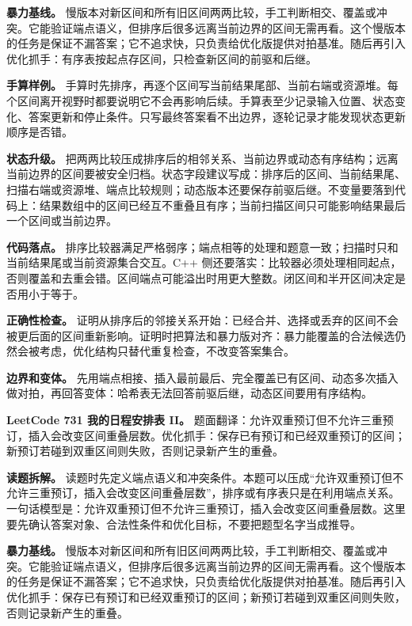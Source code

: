 \textbf{暴力基线。} 慢版本对新区间和所有旧区间两两比较，手工判断相交、覆盖或冲突。它能验证端点语义，但排序后很多远离当前边界的区间无需再看。这个慢版本的任务是保证不漏答案；它不追求快，只负责给优化版提供对拍基准。随后再引入优化抓手：有序表按起点存区间，只检查新区间的前驱和后继。

\textbf{手算样例。} 手算时先排序，再逐个区间写当前结果尾部、当前右端或资源堆。每个区间离开视野时都要说明它不会再影响后续。手算表至少记录输入位置、状态变化、答案更新和停止条件。只写最终答案看不出边界，逐轮记录才能发现状态更新顺序是否错。

\textbf{状态升级。} 把两两比较压成排序后的相邻关系、当前边界或动态有序结构；远离当前边界的区间要被安全归档。状态字段建议写成：排序后的区间、当前结果尾、扫描右端或资源堆、端点比较规则；动态版本还要保存前驱后继。不变量要落到代码上：结果数组中的区间已经互不重叠且有序；当前扫描区间只可能影响结果最后一个区间或当前边界。

\textbf{代码落点。} 排序比较器满足严格弱序；端点相等的处理和题意一致；扫描时只和当前结果尾或当前资源集合交互。C++ 侧还要落实：比较器必须处理相同起点，否则覆盖和去重会错。区间端点可能溢出时用更大整数。闭区间和半开区间决定是否用小于等于。

\textbf{正确性检查。} 证明从排序后的邻接关系开始：已经合并、选择或丢弃的区间不会被更后面的区间重新影响。证明时把算法和暴力版对齐：暴力能覆盖的合法候选仍然会被考虑，优化结构只替代重复检查，不改变答案集合。

\textbf{边界和变体。} 先用端点相接、插入最前最后、完全覆盖已有区间、动态多次插入做对拍，再回答变体：哈希表无法回答前驱后继，动态区间要用有序结构。

\noindent\textbf{LeetCode 731 我的日程安排表 II。} 题面翻译：允许双重预订但不允许三重预订，插入会改变区间重叠层数。优化抓手：保存已有预订和已经双重预订的区间；新预订若碰到双重区间则失败，否则记录新产生的重叠。

\textbf{读题拆解。} 读题时先定义端点语义和冲突条件。本题可以压成“允许双重预订但不允许三重预订，插入会改变区间重叠层数”，排序或有序表只是在利用端点关系。一句话模型是：允许双重预订但不允许三重预订，插入会改变区间重叠层数。这里要先确认答案对象、合法性条件和优化目标，不要把题型名字当成推导。

\textbf{暴力基线。} 慢版本对新区间和所有旧区间两两比较，手工判断相交、覆盖或冲突。它能验证端点语义，但排序后很多远离当前边界的区间无需再看。这个慢版本的任务是保证不漏答案；它不追求快，只负责给优化版提供对拍基准。随后再引入优化抓手：保存已有预订和已经双重预订的区间；新预订若碰到双重区间则失败，否则记录新产生的重叠。

